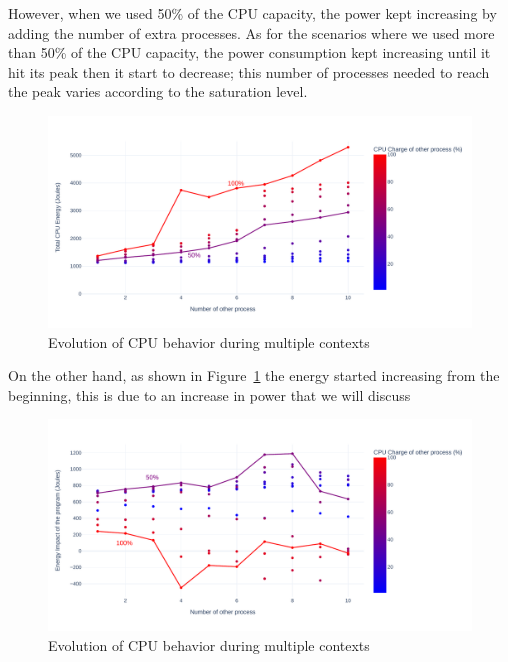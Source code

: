 However, when we used 50\% of the CPU capacity, the power kept increasing by adding the number of extra processes. As for the scenarios where we used more than 50\% of the CPU capacity, the power consumption kept increasing until it hit its peak then it start to decrease; this number of processes needed to reach the peak varies according to the saturation level.





\begin{figure}[!h]
      \centering
      \caption{Evolution of CPU behavior during multiple contexts }
      \label{fig:green_faas_energy}
      \includegraphics[width=\linewidth]{chapters/green_faas_energy}
\end{figure}

On the other hand, as shown in Figure~\ref{fig:green_faas_energy} the energy started increasing from the beginning, this is due to an increase in power that we will discuss










\begin{figure}[!h]
      \centering
      \caption{Evolution of CPU behavior during multiple contexts }
      \label{fig:green_faas_impact}
      \includegraphics[width=\linewidth]{chapters/green_faas_impact}
\end{figure}



